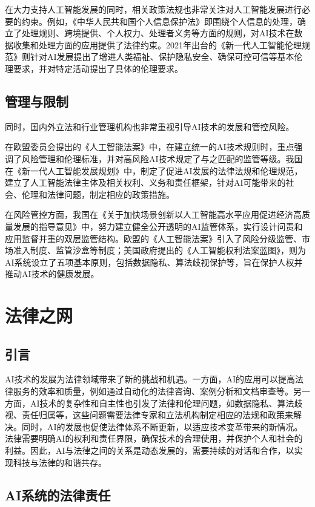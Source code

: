 在大力支持人工智能发展的同时，相关政策法规也非常关注对人工智能发展进行必要的约束。例如，《中华人民共和国个人信息保护法》即围绕个人信息的处理，确立了处理规则、跨境提供、个人权力、处理者义务等方面的规则，对AI技术在数据收集和处理方面的应用提供了法律约束。2021年出台的《新一代人工智能伦理规范》则针对AI发展提出了增进人类福祉、保护隐私安全、确保可控可信等基本伦理要求，并对特定活动提出了具体的伦理要求。

\subsection{管理与限制}
同时，国内外立法和行业管理机构也非常重视引导AI技术的发展和管控风险。

在欧盟委员会提出的《人工智能法案》中，在建立统一的AI技术规则时，重点强调了风险管理和伦理标准，并对高风险AI技术规定了与之匹配的监管等级。我国在《新⼀代⼈⼯智能发展规划》中，制定了促进AI发展的法律法规和伦理规范，建立了人工智能法律主体及相关权利、义务和责任框架，针对AI可能带来的社会、伦理和法律问题，制定相应的政策措施。

在风险管控方面，我国在《关于加快场景创新以人工智能高水平应用促进经济高质量发展的指导意见》中，努力建立健全公开透明的AI监管体系，实行设计问责和应用监督并重的双层监管结构。欧盟的《人工智能法案》引入了风险分级监管、市场准入制度、监管沙盒等制度；美国政府提出的《人工智能权利法案蓝图》，则为AI系统设立了五项基本原则，包括数据隐私、算法歧视保护等，旨在保护人权并推动AI技术的健康发展。

\section{法律之网}

\subsection{引言}
AI技术的发展为法律领域带来了新的挑战和机遇。一方面，AI的应用可以提高法律服务的效率和质量，例如通过自动化的法律咨询、案例分析和文档审查等。另一方面，AI技术的复杂性和自主性也引发了法律和伦理问题，如数据隐私、算法歧视、责任归属等，这些问题需要法律专家和立法机构制定相应的法规和政策来解决。同时，AI的发展也促使法律体系不断更新，以适应技术变革带来的新情况。法律需要明确AI的权利和责任界限，确保技术的合理使用，并保护个人和社会的利益。因此，AI与法律之间的关系是动态发展的，需要持续的对话和合作，以实现科技与法律的和谐共存。

\subsection{AI系统的法律责任}

